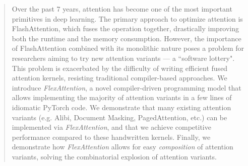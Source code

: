 \begin{abstract}
Over the past 7 years, attention has become one of the most important primitives in deep learning. The primary approach to optimize attention is FlashAttention, which fuses the operation together, drastically improving both the runtime and the memory consumption. However, the importance of FlashAttention combined with its monolithic nature poses a problem for researchers aiming to try new attention variants --- a ``software lottery". 
This problem is exacerbated by the difficulty of writing efficient fused attention kernels, resisting traditional compiler-based approaches. 
We introduce \textit{FlexAttention}, a novel compiler-driven programming model that allows implementing the majority of attention variants in a few lines of idiomatic PyTorch code. We demonstrate that many existing attention variants (e.g. Alibi, Document Masking, PagedAttention, etc.) can be implemented via \textit{FlexAttention}, and that we achieve competitive performance compared to these handwritten kernels. Finally, we demonstrate how \textit{FlexAttention} allows for easy \textit{composition} of attention variants, solving the combinatorial explosion of attention variants.
\end{abstract}